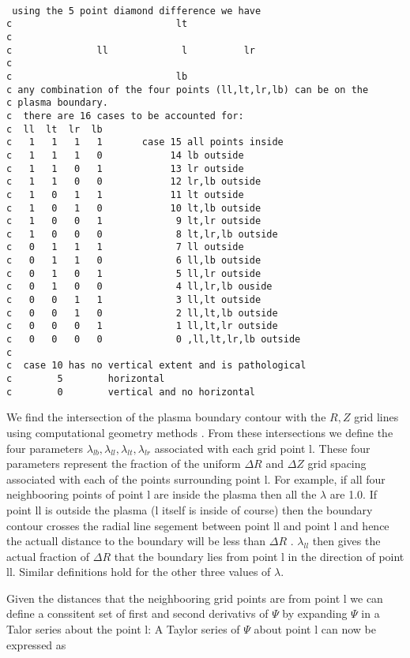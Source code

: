 \tiny

\begin{verbatim}

 using the 5 point diamond difference we have
c                             lt
c
c               ll             l          lr
c
c                             lb
c any combination of the four points (ll,lt,lr,lb) can be on the
c plasma boundary.
c  there are 16 cases to be accounted for:
c  ll  lt  lr  lb
c   1   1   1   1       case 15 all points inside
c   1   1   1   0            14 lb outside
c   1   1   0   1            13 lr outside
c   1   1   0   0            12 lr,lb outside
c   1   0   1   1            11 lt outside
c   1   0   1   0            10 lt,lb outside
c   1   0   0   1             9 lt,lr outside
c   1   0   0   0             8 lt,lr,lb outside
c   0   1   1   1             7 ll outside
c   0   1   1   0             6 ll,lb outside
c   0   1   0   1             5 ll,lr outside
c   0   1   0   0             4 ll,lr,lb ouside
c   0   0   1   1             3 ll,lt outside
c   0   0   1   0             2 ll,lt,lb outside
c   0   0   0   1             1 ll,lt,lr outside
c   0   0   0   0             0 ,ll,lt,lr,lb outside
c
c  case 10 has no vertical extent and is pathological
c        5        horizontal
c        0        vertical and no horizontal 

\end{verbatim}
 \normalsize

 We find the intersection of the plasma boundary contour with the $ R,Z $ grid
 lines using computational geometry methods . From these intersections we define
 the four parameters
 ${\lambda_{lb},\lambda_{ll},\lambda_{lt},\lambda_{lr}}$
 associated with each grid point l. These four parameters represent
 the fraction of the uniform $ \Delta R $ and $ \Delta Z $ grid spacing
 associated with each of the points surrounding point l. For example,
 if all four neighbooring points of point l are inside the plasma then
 all the $\lambda $ are 1.0. If point ll is outside the plasma (l
 itself is inside of course) then the boundary contour crosses the
 radial line segement between point ll and point l and hence  the
 actuall distance to the boundary will be less than $ \Delta R $ .
 $\lambda_{ll}$ then gives the actual fraction of $\Delta R$ that the
 boundary lies from point l in the direction of point ll. Similar
 definitions hold for the other three values of $\lambda $.

 Given the distances that the neighbooring grid points are from point
 l we can define a conssitent set of first and second derivativs of
 $\Psi $ by expanding $\Psi $ in a Talor series about the point l:
 A Taylor series of $\Psi $ about point l can now be expressed as 

